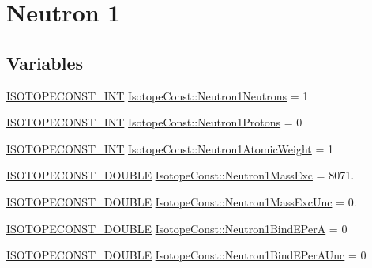 \hypertarget{group___isotope_const-_neutron-n1}{}\section{Neutron 1}
\label{group___isotope_const-_neutron-n1}
\subsection*{Variables}
\begin{DoxyCompactItemize}
\item 
\mbox{\hyperlink{group___isotope_const-_macros_ga5f18360b3e99483a35c32d789e62621c}{I\+S\+O\+T\+O\+P\+E\+C\+O\+N\+S\+T\+\_\+\+I\+NT}} \mbox{\hyperlink{group___isotope_const-_neutron-n1_ga22a554f59ca63213387a1108295a4fcb}{Isotope\+Const\+::\+Neutron1\+Neutrons}} = 1
\item 
\mbox{\hyperlink{group___isotope_const-_macros_ga5f18360b3e99483a35c32d789e62621c}{I\+S\+O\+T\+O\+P\+E\+C\+O\+N\+S\+T\+\_\+\+I\+NT}} \mbox{\hyperlink{group___isotope_const-_neutron-n1_ga8405a8e76ff070453aace58995502a28}{Isotope\+Const\+::\+Neutron1\+Protons}} = 0
\item 
\mbox{\hyperlink{group___isotope_const-_macros_ga5f18360b3e99483a35c32d789e62621c}{I\+S\+O\+T\+O\+P\+E\+C\+O\+N\+S\+T\+\_\+\+I\+NT}} \mbox{\hyperlink{group___isotope_const-_neutron-n1_ga9e590b8cce2d592193aeae35b302b826}{Isotope\+Const\+::\+Neutron1\+Atomic\+Weight}} = 1
\item 
\mbox{\hyperlink{group___isotope_const-_macros_ga8f45a7272ce02c0b4c65c44636ed719a}{I\+S\+O\+T\+O\+P\+E\+C\+O\+N\+S\+T\+\_\+\+D\+O\+U\+B\+LE}} \mbox{\hyperlink{group___isotope_const-_neutron-n1_ga8e6004b0b06946670ba883f3e63ffad8}{Isotope\+Const\+::\+Neutron1\+Mass\+Exc}} = 8071.
\item 
\mbox{\hyperlink{group___isotope_const-_macros_ga8f45a7272ce02c0b4c65c44636ed719a}{I\+S\+O\+T\+O\+P\+E\+C\+O\+N\+S\+T\+\_\+\+D\+O\+U\+B\+LE}} \mbox{\hyperlink{group___isotope_const-_neutron-n1_ga838df517be679dba5d2873c5505fbd60}{Isotope\+Const\+::\+Neutron1\+Mass\+Exc\+Unc}} = 0.
\item 
\mbox{\hyperlink{group___isotope_const-_macros_ga8f45a7272ce02c0b4c65c44636ed719a}{I\+S\+O\+T\+O\+P\+E\+C\+O\+N\+S\+T\+\_\+\+D\+O\+U\+B\+LE}} \mbox{\hyperlink{group___isotope_const-_neutron-n1_gac79335b1af3b2e7035323a89aa5135fd}{Isotope\+Const\+::\+Neutron1\+Bind\+E\+PerA}} = 0
\item 
\mbox{\hyperlink{group___isotope_const-_macros_ga8f45a7272ce02c0b4c65c44636ed719a}{I\+S\+O\+T\+O\+P\+E\+C\+O\+N\+S\+T\+\_\+\+D\+O\+U\+B\+LE}} \mbox{\hyperlink{group___isotope_const-_neutron-n1_ga84f9e07f1fb2edddae152fff6fc49f76}{Isotope\+Const\+::\+Neutron1\+Bind\+E\+Per\+A\+Unc}} = 0

\end{DoxyCompactItemize}
